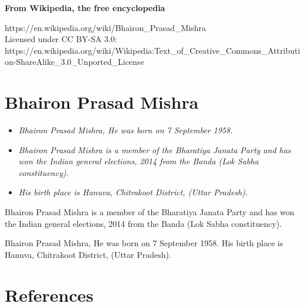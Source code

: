 \textbf{From Wikipedia, the free encyclopedia}

https://en.wikipedia.org/wiki/Bhairon\_Prasad\_Mishra\\
Licensed under CC BY-SA 3.0:\\
https://en.wikipedia.org/wiki/Wikipedia:Text\_of\_Creative\_Commons\_Attribution-ShareAlike\_3.0\_Unported\_License

\section{Bhairon Prasad Mishra}\label{bhairon-prasad-mishra}

\begin{itemize}
\item
  \emph{Bhairon Prasad Mishra, He was born on 7 September 1958.}
\item
  \emph{Bhairon Prasad Mishra is a member of the Bharatiya Janata Party
  and has won the Indian general elections, 2014 from the Banda (Lok
  Sabha constituency).}
\item
  \emph{His birth place is Hanuva, Chitrakoot District, (Uttar
  Pradesh).}
\end{itemize}

Bhairon Prasad Mishra is a member of the Bharatiya Janata Party and has
won the Indian general elections, 2014 from the Banda (Lok Sabha
constituency).

Bhairon Prasad Mishra, He was born on 7 September 1958. His birth place
is Hanuva, Chitrakoot District, (Uttar Pradesh).

\section{References}\label{references}

